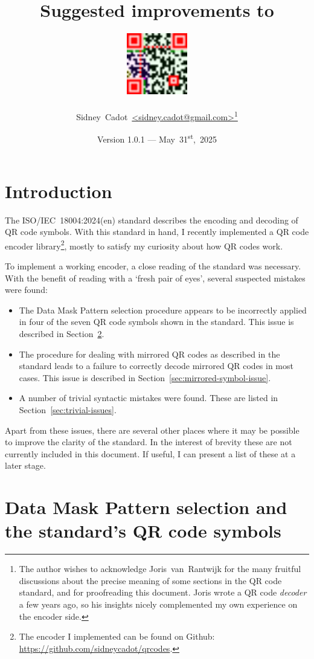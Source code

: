 \documentclass[a4paper,twoside]{article}
\title{Suggested improvements to \standard}
\author{\includegraphics[width=0.2\textwidth]{images/email.png} \\ \\ Sidney~Cadot~\url{<sidney.cadot@gmail.com>}\footnote{The author wishes to acknowledge Joris~van~Rantwijk for the many fruitful discussions about the
precise meaning of some sections in the QR code standard, and for proofreading this document. Joris wrote a QR code \emph{decoder} a few years ago, so his insights nicely complemented my own experience on the encoder side.}}
\date{Version 1.0.1 --- May~31\textsuperscript{st},~2025}
\newcommand{\shortstandard}{ISO/IEC~18004}
\newcommand{\standard}{\shortstandard:2024(en)}
\begin{document}
%
\maketitle
\tableofcontents
%
\section{Introduction}

The \standard{} standard describes the encoding and decoding of QR code symbols. With this standard in hand,
I recently implemented a QR code encoder library\footnote{The encoder I implemented can be found on Github:
\url{https://github.com/sidneycadot/qrcodes}.}, mostly to satisfy my curiosity about how QR codes work.

To implement a working encoder, a close reading of the standard was necessary. With the benefit of reading
with a `fresh pair of eyes', several suspected mistakes were found:

\begin{itemize}
\item The Data Mask Pattern selection procedure appears to be incorrectly applied in four of the seven
      QR code symbols shown in the standard.
      This issue is described in Section~\ref{sec:data-mask-pattern-selection}.
\item The procedure for dealing with mirrored QR codes as described in the standard leads to a failure
      to correctly decode mirrored QR codes in most cases.
      This issue is described in Section~\ref{sec:mirrored-symbol-issue}.
\item A number of trivial syntactic mistakes were found.
      These are listed in Section~\ref{sec:trivial-issues}.
\end{itemize}

Apart from these issues, there are several other places where it may be possible to improve the clarity
of the standard. In the interest of brevity these are not currently included in this document. If useful,
I can present a list of these at a later stage.


\section{Data Mask Pattern selection and the standard's QR code symbols}
\label{sec:data-mask-pattern-selection}
\end{document}
